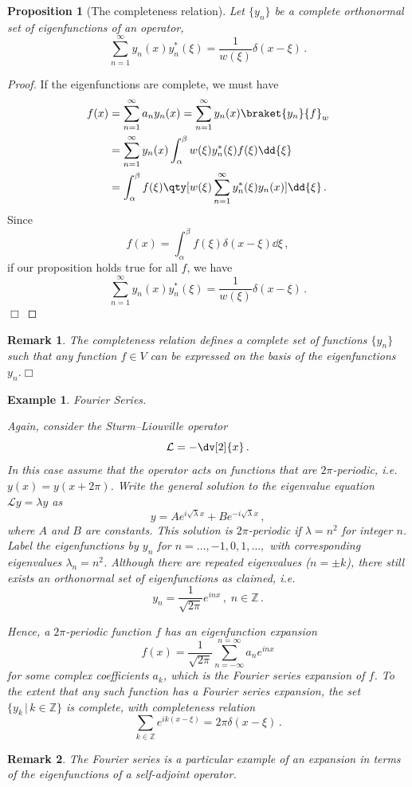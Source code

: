 \documentclass{article}
\theoremstyle{plain}\theoremheaderfont{\normalfont\itshape}\theorembodyfont{\rmfamily}\theoremseparator{.}\newtheorem*{rem}{Remark}\newtheorem*{ex}{Example}\newtheorem*{proof}{Proof}\newtheorem*{altp}{Alternative proof}
\theoremstyle{plain}\theoremheaderfont{\normalfont\bfseries}\theorembodyfont{\rmfamily}\theoremseparator{.}\newtheorem{thm}{Theorem}[section]\newtheorem{lem}[thm]{Lemma}\newtheorem{prop}[thm]{Proposition}\newtheorem*{cor}{Corollary}\newtheorem{defn}[thm]{Definition}\newtheorem{clm}[thm]{Claim}\newtheorem{clminproof}{Claim}
\theoremstyle{break}\theoremheaderfont{\normalfont\itshape}\theorembodyfont{\rmfamily}\theoremseparator{.\medskip}\newtheorem*{proofskip}{Proof}\newtheorem*{exs}{Examples}\newtheorem*{rems}{Remarks}
\theoremstyle{break}\theoremheaderfont{\normalfont\bfseries}\theorembodyfont{\rmfamily}\theoremseparator{.\medskip}\newtheorem{lemskip}[thm]{Lemma}\newtheorem{defnskip}[thm]{Definition}\newtheorem{propskip}[thm]{Proposition}\newtheorem{thmskip}[thm]{Theorem}
\numberwithin{equation}{section}
\newcommand{\qed}{\hfill\ensuremath{\Box}}
\begin{document}
	\begin{prop}[The completeness relation]
		Let \(\{y_n\}\) be a complete orthonormal set of eigenfunctions of an operator,
		\[\sum_{n=1}^{\infty}y_n(x)y_n^*(\xi)=\frac{1}{w(\xi)}\delta(x-\xi)\,.\]
	\end{prop}
	\begin{proof}
		If the eigenfunctions are complete, we must have
		\begin{align*}
			f(x)&=\sum_{n=1}^{\infty}a_ny_n(x)=\sum_{n=1}^{\infty}y_n(x)\braket{y_n}{f}_w\\
			&=\sum_{n=1}^{\infty}y_n(x)\int_{\alpha}^{\beta}w(\xi)y_n^*(\xi)f(\xi)\dd{\xi}\\
			&=\int_{\alpha}^{\beta}f(\xi)\qty[w(\xi)\sum_{n=1}^{\infty}y_n^*(\xi)y_n(x)]\dd{\xi}\,.
		\end{align*}
		Since
		\[f(x)=\int_{\alpha}^{\beta}f(\xi)\delta(x-\xi)\dd{\xi}\,,\]
		if our proposition holds true for all \(f\), we have
		\[\sum_{n=1}^{\infty}y_n(x)y_n^*(\xi)=\frac{1}{w(\xi)}\delta(x-\xi)\,.\]\qed
	\end{proof}
	\begin{rem}
		The completeness relation defines a complete set of functions \(\{y_n\}\) such that any function \(f\in V\) can be expressed on the basis of the eigenfunctions \(y_n\).\qed
	\end{rem}

	\begin{ex}
		\textit{Fourier Series.}
		
		Again, consider the Sturm--Liouville operator
		\[\mathcal{L}=-\dv[2]{x}\,.\]
		In this case assume that the operator acts on functions that are \(2\pi\)-periodic, i.e. \(y(x)=y(x+2\pi)\). Write the general solution to the eigenvalue equation \(\mathcal{L}y=\lambda y\) as
		\[y=Ae^{i\sqrt{\lambda}x}+Be^{-i\sqrt{\lambda}x}\,,\]
		where \(A\) and \(B\) are constants. This solution is \(2\pi\)-periodic if \(\lambda=n^2\) for integer \(n\). Label the eigenfunctions by \(y_n\) for \(n=\dots,-1,0,1,\dots,\) with corresponding eigenvalues \(\lambda_n=n^2\). Although there are repeated eigenvalues (\(n=\pm k\)), there still exists an orthonormal set of eigenfunctions as claimed, i.e.
		\[y_n=\frac{1}{\sqrt{2\pi}}e^{inx}\,,\;n\in\mathbb{Z}\,.\]

		Hence, a \(2\pi\)-periodic function \(f\) has an eigenfunction expansion
		\[f(x)=\frac{1}{\sqrt{2\pi}}\sum_{n=-\infty}^{n=\infty}a_ne^{inx}\]
		for some complex coefficients \(a_k\), which is the Fourier series expansion of \(f\). To the extent that any such function has a Fourier series expansion, the set \(\{ y_k\,|\,k\in\mathbb{Z}\}\) is complete, with completeness relation
		\[\sum_{k\in\mathbb{Z}}e^{ik(x-\xi)}=2\pi\delta(x-\xi)\,.\]
	\end{ex}
	\begin{rem}
		The Fourier series is a particular example of an expansion in terms of the eigenfunctions of a self-adjoint operator.
	\end{rem}
		
\end{document}
